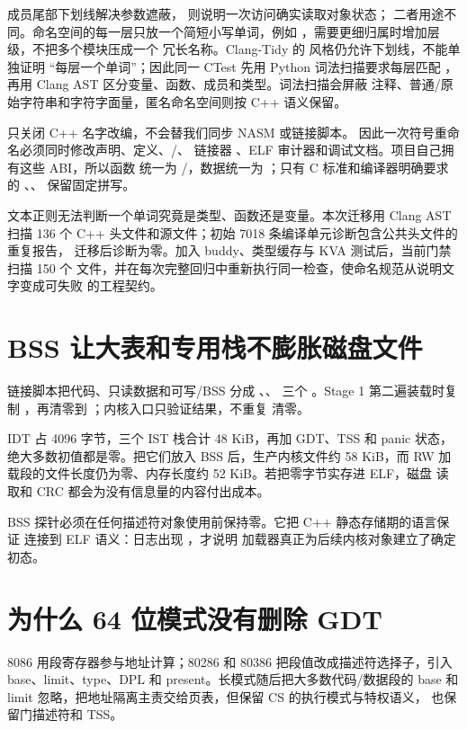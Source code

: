 成员尾部下划线解决参数遮蔽， 则说明一次访问确实读取对象状态；
二者用途不同。命名空间的每一层只放一个简短小写单词，例如
，需要更细归属时增加层级，不把多个模块压成一个
冗长名称。Clang-Tidy 的  风格仍允许下划线，不能单独证明
“每层一个单词”；因此同一 CTest 先用 Python 词法扫描要求每层匹配
\code{[a-z]+}，再用 Clang AST 区分变量、函数、成员和类型。词法扫描会屏蔽
注释、普通/原始字符串和字符字面量，匿名命名空间则按 C++ 语义保留。

 只关闭 C++ 名字改编，不会替我们同步 NASM 或链接脚本。
因此一次符号重命名必须同时修改声明、定义、/、
链接器 、ELF 审计器和调试文档。项目自己拥有这些 ABI，所以函数
统一为 /，数据统一为
；只有 C 标准和编译器明确要求的
、、 保留固定拼写。

文本正则无法判断一个单词究竟是类型、函数还是变量。本次迁移用 Clang AST 扫描
136 个 C++ 头文件和源文件；初始 7018 条编译单元诊断包含公共头文件的重复报告，
迁移后诊断为零。加入 buddy、类型缓存与 KVA 测试后，当前门禁扫描 150 个
文件，并在每次完整回归中重新执行同一检查，使命名规范从说明文字变成可失败
的工程契约。

\section{BSS 让大表和专用栈不膨胀磁盘文件}

链接脚本把代码、只读数据和可写/BSS 分成 、、
 三个 。Stage 1 第二遍装载时复制
，再清零到 ；内核入口只验证结果，不重复
清零。

IDT 占 4096 字节，三个 IST 栈合计 48 KiB，再加 GDT、TSS 和 panic 状态，
绝大多数初值都是零。把它们放入 BSS 后，生产内核文件约 58 KiB，而 RW
加载段的文件长度仍为零、内存长度约 52 KiB。若把零字节实存进 ELF，磁盘
读取和 CRC 都会为没有信息量的内容付出成本。

BSS 探针必须在任何描述符对象使用前保持零。它把 C++ 静态存储期的语言保证
连接到 ELF  语义：日志出现 ，才说明
加载器真正为后续内核对象建立了确定初态。

\section{为什么 64 位模式没有删除 GDT}

8086 用段寄存器参与地址计算；80286 和 80386 把段值改成描述符选择子，引入
base、limit、type、DPL 和 present。长模式随后把大多数代码/数据段的 base
和 limit 忽略，把地址隔离主责交给页表，但保留 CS 的执行模式与特权语义，
也保留门描述符和 TSS。

